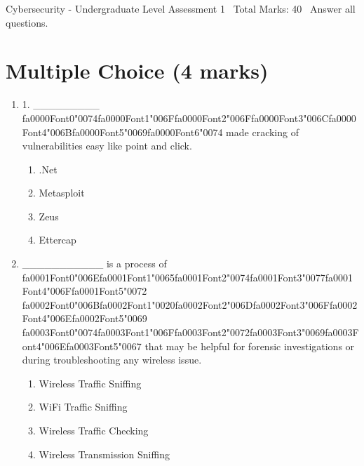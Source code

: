 \documentclass[12pt]{article}
\begin{document}
\begin{center}
Cybersecurity - Undergraduate Level Assessment 1 \
Total Marks: 40 \
Answer all questions.
\end{center}

\section*{Multiple Choice (4 marks)}
\begin{enumerate}[label=\arabic*.]
\item 1. \_\_\_\_\_\_\_\_\_ {\csname fa0000Font0\endcsname\char"0074}{\csname fa0000Font1\endcsname\char"006F}{\csname fa0000Font2\endcsname\char"006F}{\csname fa0000Font3\endcsname\char"006C}{\csname fa0000Font4\endcsname\char"006B}{\csname fa0000Font5\endcsname\char"0069}{\csname fa0000Font6\endcsname\char"0074} made cracking of vulnerabilities easy like point and click.
\begin{enumerate}[label=(\alph*)]
    \item .Net
    \item Metasploit
    \item Zeus
    \item Ettercap
\end{enumerate}
\item \_\_\_\_\_\_\_\_\_\_\_ is a process of {\csname fa0001Font0\endcsname\char"006E}{\csname fa0001Font1\endcsname\char"0065}{\csname fa0001Font2\endcsname\char"0074}{\csname fa0001Font3\endcsname\char"0077}{\csname fa0001Font4\endcsname\char"006F}{\csname fa0001Font5\endcsname\char"0072} {\csname fa0002Font0\endcsname\char"006B}{\csname fa0002Font1\endcsname\char"0020}{\csname fa0002Font2\endcsname\char"006D}{\csname fa0002Font3\endcsname\char"006F}{\csname fa0002Font4\endcsname\char"006E}{\csname fa0002Font5\endcsname\char"0069} {\csname fa0003Font0\endcsname\char"0074}{\csname fa0003Font1\endcsname\char"006F}{\csname fa0003Font2\endcsname\char"0072}{\csname fa0003Font3\endcsname\char"0069}{\csname fa0003Font4\endcsname\char"006E}{\csname fa0003Font5\endcsname\char"0067} that may be helpful for forensic investigations or during troubleshooting any wireless issue.
\begin{enumerate}[label=(\alph*)]
    \item Wireless Traffic Sniffing
    \item WiFi Traffic Sniffing
    \item Wireless Traffic Checking
    \item Wireless Transmission Sniffing
\end{enumerate}
\end{enumerate}
\end{document}
